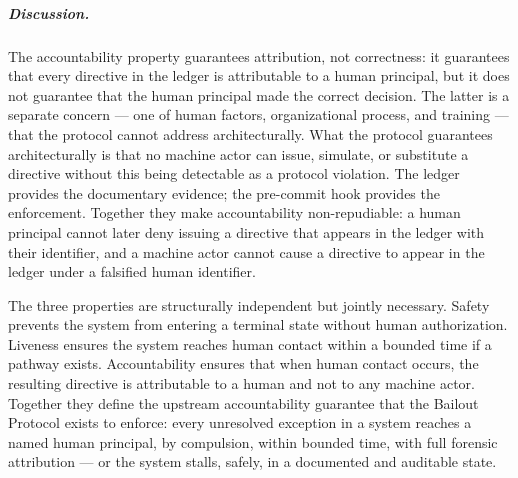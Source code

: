 \subparagraph{Discussion.} The accountability property guarantees attribution, not correctness: it guarantees that every directive in the ledger is attributable to a human principal, but it does not guarantee that the human principal made the correct decision. The latter is a separate concern --- one of human factors, organizational process, and training --- that the protocol cannot address architecturally. What the protocol guarantees architecturally is that no machine actor can issue, simulate, or substitute a directive without this being detectable as a protocol violation. The ledger provides the documentary evidence; the pre-commit hook provides the enforcement. Together they make accountability non-repudiable: a human principal cannot later deny issuing a directive that appears in the ledger with their identifier, and a machine actor cannot cause a directive to appear in the ledger under a falsified human identifier.

The three properties are structurally independent but jointly necessary. Safety prevents the system from entering a terminal state without human authorization. Liveness ensures the system reaches human contact within a bounded time if a pathway exists. Accountability ensures that when human contact occurs, the resulting directive is attributable to a human and not to any machine actor. Together they define the upstream accountability guarantee that the Bailout Protocol exists to enforce: every unresolved exception in a \bxthree{} system reaches a named human principal, by compulsion, within bounded time, with full forensic attribution --- or the system stalls, safely, in a documented and auditable state.